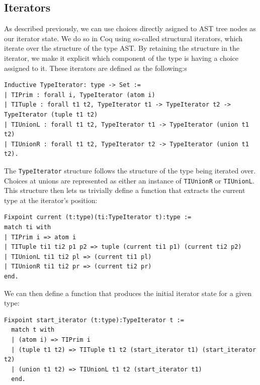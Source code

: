 \documentclass[a4paper,english]{lipics-v2019}
\begin{document}
\subsection{Iterators}

As described previously, we can use choices directly asigned to AST tree nodes
as our iterator state. We do so in Coq using so-called structural iterators,
which iterate over the structure of the type AST. By retaining the structure
in the iterator, we make it explicit which component of the type is having a
choice assigned to it. These iterators are defined as the following:s

\begin{small}\begin{verbatim}
Inductive TypeIterator: type -> Set :=
| TIPrim : forall i, TypeIterator (atom i)
| TITuple : forall t1 t2, TypeIterator t1 -> TypeIterator t2 -> TypeIterator (tuple t1 t2)
| TIUnionL : forall t1 t2, TypeIterator t1 -> TypeIterator (union t1 t2)
| TIUnionR : forall t1 t2, TypeIterator t2 -> TypeIterator (union t1 t2).
\end{verbatim}\end{small}

The \verb|TypeIterator| structure follows the structure of the type being
iterated over. Choices at unions are represented as either an instance of
\verb|TIUnionR| or \verb|TIUnionL|. This structure then lets us trivially
define a function that extracts the current type at the iterator's position:

\begin{small}\begin{verbatim}
Fixpoint current (t:type)(ti:TypeIterator t):type :=
match ti with
| TIPrim i => atom i
| TITuple ti1 ti2 p1 p2 => tuple (current ti1 p1) (current ti2 p2)
| TIUnionL ti1 ti2 pl => (current ti1 pl)
| TIUnionR ti1 ti2 pr => (current ti2 pr)
end.
\end{verbatim}
\end{small}

\noindent We can then define a function that produces the initial iterator state for a
given type:

\begin{small}
\begin{verbatim}
Fixpoint start_iterator (t:type):TypeIterator t :=
  match t with
  | (atom i) => TIPrim i
  | (tuple t1 t2) => TITuple t1 t2 (start_iterator t1) (start_iterator t2)
  | (union t1 t2) => TIUnionL t1 t2 (start_iterator t1)
  end.
\end{verbatim}
\end{small}
\end{document}
